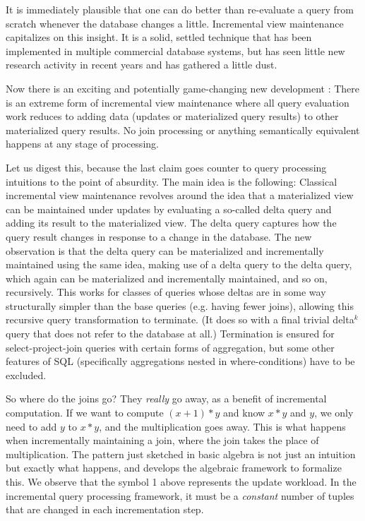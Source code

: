 
It is immediately plausible that one can do better than re-evaluate a query from scratch whenever the database changes a little. Incremental view maintenance capitalizes on this insight. It is a solid, settled technique that has been implemented in multiple commercial database systems, but has seen little new research activity in recent years and has gathered a little dust.

Now there is an exciting and potentially game-changing new development \cite{ahmad-vldb:09, koch-pods:10, kennedy-ahmad-koch-cidr:11}: There is an extreme form of incremental view maintenance where all query evaluation work reduces to adding data (updates or materialized query results) to other materialized query results.  No join processing or anything semantically equivalent happens at any stage of processing.

Let us digest this, because the last claim goes counter to query processing intuitions to the point of absurdity. The main idea is the following: Classical incremental view maintenance revolves around the idea that a materialized view can be maintained under updates by evaluating a so-called delta query and adding its result to the materialized view. The delta query captures how the query result changes in response to a change in the database. The new observation is that the delta query can be materialized and incrementally maintained using the same idea, making use of a delta query to the delta query, which again can be materialized and incrementally maintained, and so on, recursively. This works for classes of queries whose deltas are in some way structurally simpler than the base queries (e.g. having fewer joins), allowing this recursive query transformation to terminate. (It does so with a final trivial delta$^k$ query that does not refer to the database at all.) Termination is ensured for select-project-join queries with certain forms of aggregation, but some other features of SQL (specifically aggregations nested in where-conditions) have to be excluded. 

So where do the joins go? They {\em really} go away, as a benefit of incremental computation. If we want to compute $(x+1)*y$ and know $x*y$ and $y$, we only need to add $y$ to $x*y$, and the multiplication goes away. This is what happens when incrementally maintaining a join, where the join takes the place of multiplication. The pattern just sketched in basic algebra is not just an intuition but exactly what happens, and \cite{koch-pods:10} develops the algebraic framework to formalize this. We observe that the symbol 1 above represents the update workload.  In the incremental query processing framework, it must be a {\em constant} number of tuples that are changed in each incrementation step.

